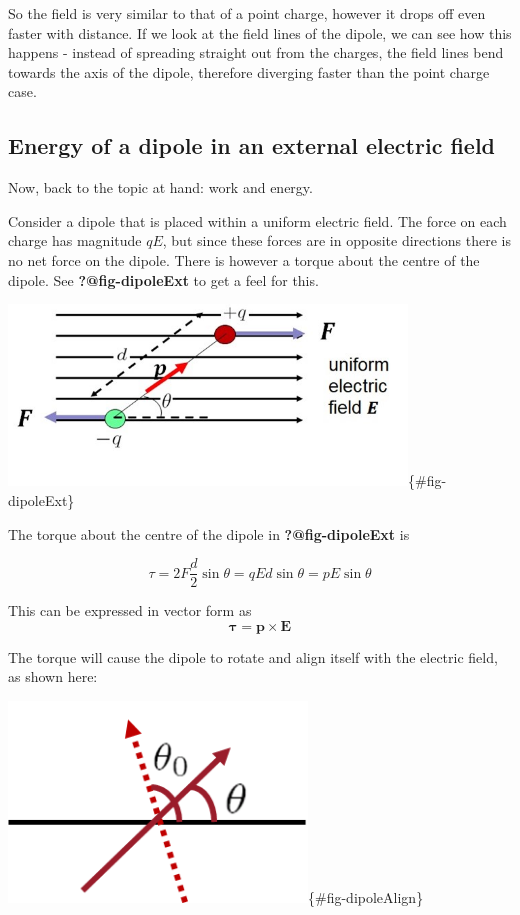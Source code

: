 \documentclass[
  letterpaper,
  DIV=11,
  numbers=noendperiod]{scrreprt}
\begin{document}
So the field is very similar to that of a point charge, however it drops
off even faster with distance. If we look at the field lines of the
dipole, we can see how this happens - instead of spreading straight out
from the charges, the field lines bend towards the axis of the dipole,
therefore diverging faster than the point charge case.

\subsection{Energy of a dipole in an external electric
field}\label{energy-of-a-dipole-in-an-external-electric-field}

Now, back to the topic at hand: work and energy.

Consider a dipole that is placed within a uniform electric field. The
force on each charge has magnitude \(qE\), but since these forces are in
opposite directions there is no net force on the dipole. There is
however a torque about the centre of the dipole. See
\textbf{?@fig-dipoleExt} to get a feel for this.

\includegraphics[width=4.16667in,height=\textheight]{Figures/dipole_extE.jpg}\{\#fig-dipoleExt\}

The torque about the centre of the dipole in \textbf{?@fig-dipoleExt} is

\[ \tau = 2 F \frac{d}{2} \sin\theta = qEd\sin\theta = p E \sin\theta \]

This can be expressed in vector form as
\[ \mathrm{\mathbf{\tau}} = \mathrm{\mathbf{p}}\times \mathrm{\mathbf{E}}\]

The torque will cause the dipole to rotate and align itself with the
electric field, as shown here:

\includegraphics[width=3.125in,height=\textheight]{Figures/dipole_align.png}\{\#fig-dipoleAlign\}
\end{document}
